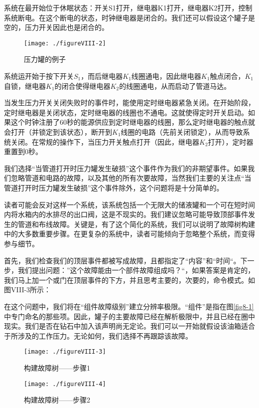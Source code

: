 \documentclass[cn,11pt,chinese]{elegantbook}
\begin{document}
{系统在最开始位于休眠状态：开关S1打开，继电器K1打开，继电器K2打开，控制系统断电。在这个断电的状态，时钟继电器是闭合的。我们还可以假设这个罐子是空的，压力开关因此也是闭合的。

\begin{figure}[h]
	\centering
	\texttt{[image: ./figureVIII-2]}
	\caption{压力罐的例子}
	\label{fig8-2}
\end{figure}

系统运开始于按下开关$S_1$，而后继电器$K_1$线圈通电，因此继电器$K_1$触点闭合，$K_1$自锁，继电器$K_1$的闭合使得继电器$K_2$的线圈通电，从而启动了管道马达。

当发生压力开关关闭失败时的事件时，能使用定时继电器紧急关闭。在开始阶段，定时继电器是关闭状态，定时继电器的线圈也不通电。这就使得定时开关启动。如果这个时钟注册了60秒的能源供应到定时继电器的线圈，那么定时继电器的触点就会打开（并锁定到该状态），断开到$K_1$线圈的电路（先前关闭锁定），从而导致系统关闭。在常规的操作下，当压力开关触点打开（因此，继电器$K_2$打开），定时器重置到0秒。

我们选择“当管道打开时压力罐发生破损”这个事件作为我们的非期望事件。如果我们忽略管道和电路的故障，以及其他的所有次要故障，当然我们主要的关注点“当管道打开时压力罐发生破损”这个事件除外，这个问题将是十分简单的。

读者可能会反对这样一个系统，该系统包括一个无限大的储液罐和一个可在短时间内将水箱内的水排尽的出口阀，这是不现实的。我们建议忽略可能导致顶部事件发生的管道和布线故障。关键是，有了这个简化的系统，我们可以说明了故障树构建中的大多数重要步骤。在更复杂的系统中，读者可能倾向于忽略整个系统，而变得参与细节。

首先，我们检查我们的顶层事件都被写成故障，且都指定了“内容”和“时间“。下一步，我们提出问题：”这个故障能由一个部件故障组成吗？“，如果答案是肯定的，我们马上加一个或门在顶层事件的下方，并且思考主要的，次要的，命令模式。如图VIII-3所示：

在这个问题中，我们将在“组件故障级别”建立分辨率极限。“组件”是指在图\ref{fig8-1}中专门命名的那些项。因此，罐子的主要故障已经在解析极限中，并且已经在圈中现实。我们是否在钻石中加入该声明尚无定论。我们可以一开始就假设该油箱适合于所涉及的工作压力。无论如何，我们选择不再跟踪该故障。

\begin{figure}[H]
	\centering
	\texttt{[image: ./figureVIII-3]}
	\caption{构建故障树——步骤1}
	\label{fig8-3}
\end{figure}

\begin{figure}[H]
	\centering
	\texttt{[image: ./figureVIII-4]}
	\caption{构建故障树——步骤2}
	\label{fig8-4}
\end{figure}

}
\end{document}
